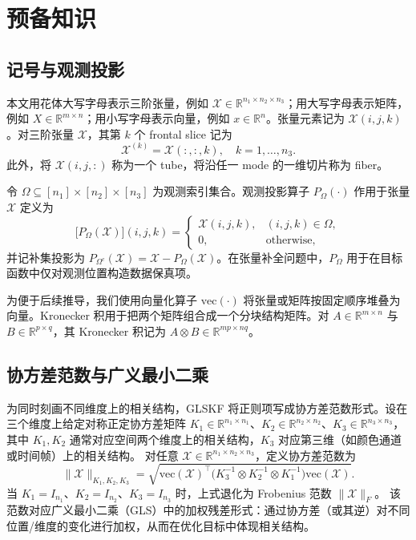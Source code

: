 \documentclass[UTF8]{ctexart}
\begin{document}
\section{预备知识}

\subsection{记号与观测投影}
本文用花体大写字母表示三阶张量，例如 $\mathcal{X}\in\mathbb{R}^{n_1\times n_2\times n_3}$；用大写字母表示矩阵，例如 $X\in\mathbb{R}^{m\times n}$；用小写字母表示向量，例如 $x\in\mathbb{R}^{n}$。张量元素记为 $\mathcal{X}(i,j,k)$。对三阶张量 $\mathcal{X}$，其第 $k$ 个 frontal slice 记为
\[
\mathcal{X}^{(k)}=\mathcal{X}(:,:,k),\quad k=1,\ldots,n_3.
\]
此外，将 $\mathcal{X}(i,j,:)$ 称为一个 tube，将沿任一 mode 的一维切片称为 fiber。

令 $\Omega\subseteq [n_1]\times[n_2]\times[n_3]$ 为观测索引集合。观测投影算子 $P_{\Omega}(\cdot)$ 作用于张量 $\mathcal{X}$ 定义为
\[
\big[P_{\Omega}(\mathcal{X})\big](i,j,k)=
\begin{cases}
\mathcal{X}(i,j,k), & (i,j,k)\in\Omega,\\
0, & \text{otherwise},
\end{cases}
\]
并记补集投影为 $P_{\Omega^c}(\mathcal{X})=\mathcal{X}-P_{\Omega}(\mathcal{X})$。在张量补全问题中，$P_{\Omega}$ 用于在目标函数中仅对观测位置构造数据保真项。

为便于后续推导，我们使用向量化算子 $\mathrm{vec}(\cdot)$ 将张量或矩阵按固定顺序堆叠为向量。Kronecker 积用于把两个矩阵组合成一个分块结构矩阵。对 $A\in\mathbb{R}^{m\times n}$ 与 $B\in\mathbb{R}^{p\times q}$，其 Kronecker 积记为 $A\otimes B\in\mathbb{R}^{mp\times nq}$。
    
\subsection{协方差范数与广义最小二乘}
为同时刻画不同维度上的相关结构，GLSKF 将正则项写成协方差范数形式\cite{lei2024glskf}。设在三个维度上给定对称正定协方差矩阵
$K_1\in\mathbb{R}^{n_1\times n_1}$、$K_2\in\mathbb{R}^{n_2\times n_2}$、$K_3\in\mathbb{R}^{n_3\times n_3}$，
其中 $K_1,K_2$ 通常对应空间两个维度上的相关结构，$K_3$ 对应第三维（如颜色通道或时间帧）上的相关结构。
对任意 $\mathcal{X}\in\mathbb{R}^{n_1\times n_2\times n_3}$，定义协方差范数为
\begin{equation*}
\|\mathcal{X}\|_{K_1,K_2,K_3}
=\sqrt{ \mathrm{vec}(\mathcal{X})^{\top}\big(K_3^{-1}\otimes K_2^{-1}\otimes K_1^{-1}\big)\mathrm{vec}(\mathcal{X})}.
\end{equation*}
当 $K_1=I_{n_1}$、$K_2=I_{n_2}$、$K_3=I_{n_3}$ 时，上式退化为 Frobenius 范数 $\|\mathcal{X}\|_F$。
该范数对应广义最小二乘（GLS）中的加权残差形式：通过协方差（或其逆）对不同位置/维度的变化进行加权，从而在优化目标中体现相关结构\cite{allen2014glsmd}。
\end{document}
